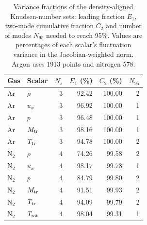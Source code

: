 \begin{table}
\centering\small
\caption{Variance fractions of the density-aligned Knudsen-number sets: leading fraction $E_1$, two-mode cumulative fraction $C_2$ and number of modes $N_{95}$ needed to reach 95\%. Values are percentages of each scalar's fluctuation variance in the Jacobian-weighted norm. Argon uses 1913 points and nitrogen 578.}\label{tab:pod_compactness}
\begin{tabular}{llrrrr}\toprule
Gas & Scalar & $N_s$ & $E_1$ (\%) & $C_2$ (\%) & $N_{95}$\\\midrule
Ar & $\rho$ & 3 & 92.42 & 100.00 & 2\\
Ar & $u_x$ & 3 & 96.92 & 100.00 & 1\\
Ar & $p$ & 3 & 96.48 & 100.00 & 1\\
Ar & $M_{\rm tr}$ & 3 & 98.16 & 100.00 & 1\\
Ar & $T_{\rm tr}$ & 3 & 94.78 & 100.00 & 2\\
N$_2$ & $\rho$ & 4 & 74.26 & 99.58 & 2\\
N$_2$ & $u_x$ & 4 & 98.17 & 99.78 & 1\\
N$_2$ & $p$ & 4 & 84.79 & 99.80 & 2\\
N$_2$ & $M_{\rm tr}$ & 4 & 91.51 & 99.93 & 2\\
N$_2$ & $T_{\rm tr}$ & 4 & 94.09 & 99.79 & 2\\
N$_2$ & $T_{\rm rot}$ & 4 & 98.04 & 99.31 & 1\\
\bottomrule\end{tabular}
\end{table}
